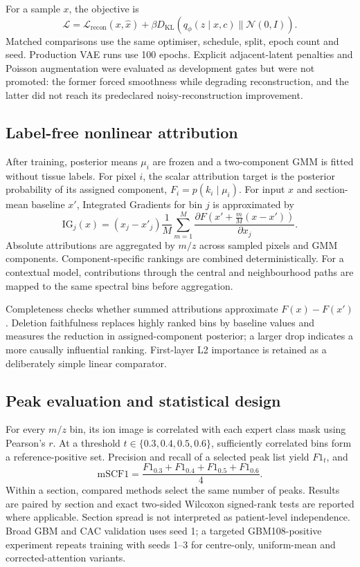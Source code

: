 For a sample $x$, the objective is
\begin{equation}
\mathcal{L}=\mathcal{L}_{\mathrm{recon}}(x,\hat{x})+
\beta D_{\mathrm{KL}}\!\left(q_\phi(z\mid x,c)\|\mathcal{N}(0,I)\right).
\end{equation}
Matched comparisons use the same optimiser, schedule, split, epoch count and
seed. Production VAE runs use 100 epochs. Explicit adjacent-latent penalties
and Poisson augmentation were evaluated as development gates but were not
promoted: the former forced smoothness while degrading reconstruction, and the
latter did not reach its predeclared noisy-reconstruction improvement.

\subsection{Label-free nonlinear attribution}

After training, posterior means $\mu_i$ are frozen and a two-component GMM is
fitted without tissue labels. For pixel $i$, the scalar attribution target is
the posterior probability of its assigned component, $F_i=p(k_i\mid\mu_i)$.
For input $x$ and section-mean baseline $x'$, Integrated Gradients for bin $j$
is approximated by
\begin{equation}
\mathrm{IG}_j(x)=(x_j-x'_j)\frac{1}{M}
\sum_{m=1}^{M}\frac{\partial F(x'+\frac{m}{M}(x-x'))}{\partial x_j}.
\end{equation}
Absolute attributions are aggregated by $m/z$ across sampled pixels and GMM
components. Component-specific rankings are combined deterministically. For a
contextual model, contributions through the central and neighbourhood paths
are mapped to the same spectral bins before aggregation.

Completeness checks whether summed attributions approximate
$F(x)-F(x')$. Deletion faithfulness replaces highly ranked bins by baseline
values and measures the reduction in assigned-component posterior; a larger
drop indicates a more causally influential ranking. First-layer L2 importance
is retained as a deliberately simple linear comparator.

\subsection{Peak evaluation and statistical design}

For every $m/z$ bin, its ion image is correlated with each expert class mask
using Pearson's $r$. At a threshold $t\in\{0.3,0.4,0.5,0.6\}$, sufficiently
correlated bins form a reference-positive set. Precision and recall of a
selected peak list yield $F1_t$, and
\begin{equation}
\mathrm{mSCF1}=\frac{F1_{0.3}+F1_{0.4}+F1_{0.5}+F1_{0.6}}{4}.
\end{equation}
Within a section, compared methods select the same number of peaks. Results are
paired by section and exact two-sided Wilcoxon signed-rank tests are reported
where applicable. Section spread is not interpreted as patient-level
independence. Broad GBM and CAC validation uses seed 1; a targeted
GBM108-positive experiment repeats training with seeds 1--3 for centre-only,
uniform-mean and corrected-attention variants.

